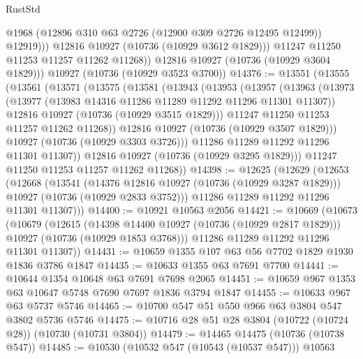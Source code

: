 \begin{lexlean}{RustStd}
\begin{coremodule}
                  @1968
                  (@12896 @310 @63 @2726 (@12900 @309 @2726 @12495 @12499))
                  @12919)))
            @12816
            @10927
            (@10736 (@10929 @3612 @1829)))
          @11247
          @11250
          @11253
          @11257
          @11262
          @11268))
      @12816
      @10927
      (@10736 (@10929 @3604 @1829)))
    @10927
    (@10736 (@10929 @3523 @3700))
@14376 := @13551
    (@13555
      (@13561
        (@13571
          (@13575
            (@13581
              (@13943
                (@13953
                  (@13957
                    (@13963
                      (@13973
                        (@13977 (@13983 @14316 @11286 @11289 @11292 @11296 @11301 @11307))
                        @12816
                        @10927
                        (@10736 (@10929 @3515 @1829)))
                      @11247
                      @11250
                      @11253
                      @11257
                      @11262
                      @11268))
                  @12816
                  @10927
                  (@10736 (@10929 @3507 @1829)))
                @10927
                (@10736 (@10929 @3303 @3726)))
              @11286
              @11289
              @11292
              @11296
              @11301
              @11307))
          @12816
          @10927
          (@10736 (@10929 @3295 @1829)))
        @11247
        @11250
        @11253
        @11257
        @11262
        @11268))
@14398 := @12625
    (@12629
      (@12653
        (@12668
          (@13541
            (@14376 @12816 @10927 (@10736 (@10929 @3287 @1829)))
            @10927
            (@10736 (@10929 @2833 @3752)))
          @11286
          @11289
          @11292
          @11296
          @11301
          @11307)))
@14400 := @10921 @10563 @2056
@14421 := @10669
    (@10673
      (@10679
        (@12615
          (@14398 @14400 @10927 (@10736 (@10929 @2817 @1829)))
          @10927
          (@10736 (@10929 @1853 @3768)))
        @11286
        @11289
        @11292
        @11296
        @11301
        @11307))
@14431 := @10659 @1355 @107 @63 @56 @7702 @1829 @1930 @1836 @3786 @1847
@14435 := @10633 @1355 @63 @7691 @7700
@14441 := @10644 @1354 @10648 @63 @7691 @7698 @2065
@14451 := @10659 @967 @1353 @63 @10647 @5748 @7690 @7697 @1836 @3794 @1847
@14455 := @10633 @967 @63 @5737 @5746
@14465 := @10700 @547 @51 @550 @966 @63 @3804 @547 @3802 @5736 @5746
@14475 := @10716 @28 @51 @28 @3804 (@10722 (@10724 @28)) (@10730 (@10731 @3804))
@14479 := @14465 @14475 (@10736 (@10738 @547))
@14485 := @10530 (@10532 @547 (@10543 (@10537 @547))) @10563

\end{coremodule}
\end{lexlean}
